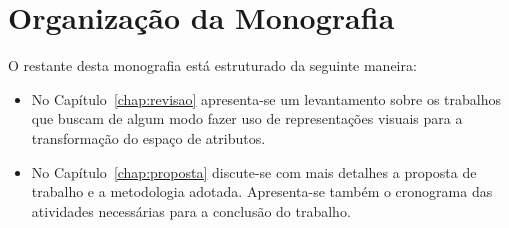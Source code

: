 
\section{Organização da Monografia}

O restante desta monografia está estruturado da seguinte maneira:

\begin{itemize}
        
  \item No Capítulo~\ref{chap:revisao} apresenta-se um levantamento sobre os trabalhos que buscam de algum modo fazer uso de representações visuais para a transformação do espaço de atributos. 

  \item No Capítulo~\ref{chap:proposta} discute-se com mais detalhes a proposta de trabalho e a metodologia adotada. Apresenta-se também o cronograma das atividades necessárias para a conclusão do trabalho.

\end{itemize}
